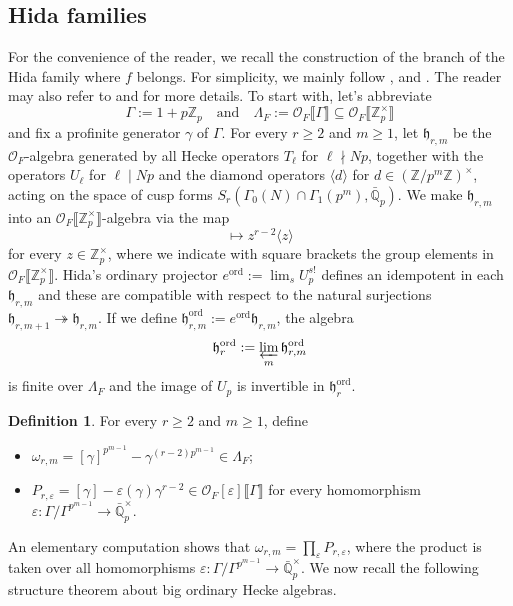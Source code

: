 \documentclass[12pt,reqno]{amsart}
\theoremstyle{definition}
\newtheorem{definition}[theorem]{Definition}
\theoremstyle{remark}
\newcommand{\numberset}{\mathbb}
\newcommand{\Q}{\numberset{Q}}
\newcommand{\Z}{\numberset{Z}}
\newcommand{\OF}{\mathcal{O}_F}
\DeclareMathOperator{\ord}{ord}
\newcommand{\e}{\varepsilon}
\newcommand{\gL}{\Lambda}
\newcommand{\h}{\mathfrak{h}}
\begin{document}
\subsection{Hida families} For the convenience of the reader, we recall the construction of the branch of the Hida family where $f$ belongs. For simplicity, we mainly follow \cite[§2.1]{Howard07:variation-of-Heegner-points-in-Hida-families}, \cite[§5]{Longo-Vigni11:quaternion-algebras-Hida-families} and \cite[§1.4]{Nekovar-Plater:parity-selmer-groups}. The reader may also refer to \cite{Hida86:Galois-representations, Hida86:Iwasawa-modules} and \cite[§12.7]{Nekovar06:selmer-complexes} for more details. To start with, let's abbreviate 
\begin{equation*}
    \Gamma:=1+p\Z_p\quad\text{and}\quad \gL_F:=\OF\llbracket \Gamma\rrbracket\subseteq\OF\llbracket \Z_p^\times\rrbracket
\end{equation*}
and fix a profinite generator $\gamma$ of $\Gamma$. For every $r\ge 2$ and $m\ge 1$, let $\mathfrak{h}_{r,m}$ be the $\OF$-algebra generated by all Hecke operators $T_\ell$ for $\ell\nmid Np$, together with the operators $U_\ell$ for $\ell\mid Np$ and the diamond operators $\langle d\rangle$ for $d\in (\Z/p^m\Z)^\times$, acting on the space of cusp forms $S_r(\Gamma_0(N)\cap\Gamma_1(p^m),\bar{\Q}_p)$. We make $\mathfrak{h}_{r,m}$ into an $\OF\llbracket \Z_p^{\times}\rrbracket$-algebra via the map
\begin{equation*}
    [z]\longmapsto z^{r-2}\langle z\rangle
\end{equation*}
for every $z\in\Z_p^\times$, where we indicate with square brackets the group elements in $\OF\llbracket \Z_p^{\times}\rrbracket$. Hida's ordinary projector $e^{\ord}:=\lim_s U_p^{s!}$ defines an idempotent in each $\mathfrak{h}_{r,m}$ and these are compatible with respect to the natural surjections $\h_{r,m+1}\twoheadrightarrow\h_{r,m}$. If we define $\h_{r,m}^{\ord}:=e^{\ord}\h_{r,m}$, the algebra
\begin{equation*}
    \h_r^{\ord}:=\varprojlim_m \h_{r,m}^{\ord}
\end{equation*}
is finite over $\gL_F$ and the image of $U_p$ is invertible in $\h_r^{\ord}$.

 \begin{definition}
        For every $r\ge 2$ and $m\ge 1$, define 
        \begin{itemize}
            \item $\omega_{r,m}=[\gamma]^{p^{m-1}}-\gamma^{(r-2)p^{m-1}}\in \gL_F$;
            \item $P_{r,\e}=[\gamma]-\e(\gamma)\gamma^{r-2}\in\mathcal{O}_F[\e]\llbracket \Gamma\rrbracket$ for every homomorphism $\e\colon \Gamma/\Gamma^{p^{m-1}}\to\bar{\Q}_p^\times$.
        \end{itemize}
    \end{definition}
    An elementary computation shows that $\omega_{r,m}=\prod_{\e}P_{r,\e}$, where the product is taken over all homomorphisms $\e: \Gamma/\Gamma^{p^{m-1}}\to\bar{\Q}_p^\times$. We now recall the following structure theorem about big ordinary Hecke algebras.
\end{document}
